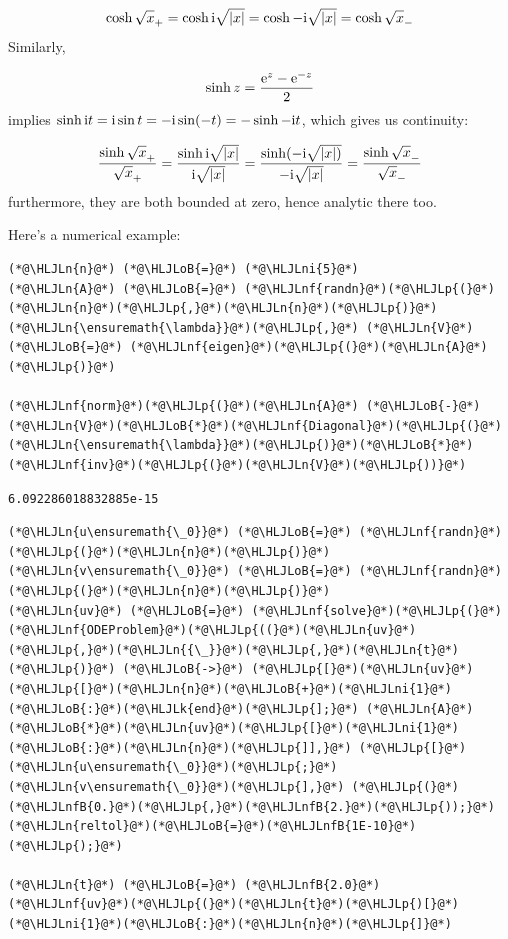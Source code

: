 \documentclass[12pt,a4paper]{article}
\newcommand{\HLJLk}[1]{\textcolor[RGB]{148,91,176}{\textbf{#1}}}
\newcommand{\HLJLn}[1]{#1}
\newcommand{\HLJLnf}[1]{\textcolor[RGB]{66,102,213}{#1}}
\newcommand{\HLJLnfB}[1]{\textcolor[RGB]{59,151,46}{#1}}
\newcommand{\HLJLni}[1]{\textcolor[RGB]{59,151,46}{#1}}
\newcommand{\HLJLoB}[1]{\textcolor[RGB]{102,102,102}{\textbf{#1}}}
\newcommand{\HLJLp}[1]{#1}
\def\I{ {\rm i} }
\def\E{ {\rm e} }
\begin{document}
\[
\cosh \sqrt{x}_+ = \cosh \I \sqrt{|x|} = \cosh -\I \sqrt{|x|} = \cosh\sqrt{x}_-
\]
Similarly, 

\[
\sinh z = {\E^z - \E^{-z} \over 2}
\]
implies $\sinh{\I t} = \I \sin t = - \I \sin(-t) = -\sinh{-\I t}$, which gives us continuity:

\[
{\sinh \sqrt{x}_+ \over \sqrt{x}_+} = {\sinh \I \sqrt{|x|} \over \I \sqrt{|x|}} = {\sinh(-\I \sqrt{|x|)} \over -\I \sqrt{|x|}} ={\sinh \sqrt{x}_- \over \sqrt{x}_-}
\]
furthermore, they are both bounded at zero, hence analytic there too.

Here's a numerical example:


\begin{lstlisting}
(*@\HLJLn{n}@*) (*@\HLJLoB{=}@*) (*@\HLJLni{5}@*)
(*@\HLJLn{A}@*) (*@\HLJLoB{=}@*) (*@\HLJLnf{randn}@*)(*@\HLJLp{(}@*)(*@\HLJLn{n}@*)(*@\HLJLp{,}@*)(*@\HLJLn{n}@*)(*@\HLJLp{)}@*) 
(*@\HLJLn{\ensuremath{\lambda}}@*)(*@\HLJLp{,}@*) (*@\HLJLn{V}@*) (*@\HLJLoB{=}@*) (*@\HLJLnf{eigen}@*)(*@\HLJLp{(}@*)(*@\HLJLn{A}@*)(*@\HLJLp{)}@*)

(*@\HLJLnf{norm}@*)(*@\HLJLp{(}@*)(*@\HLJLn{A}@*) (*@\HLJLoB{-}@*) (*@\HLJLn{V}@*)(*@\HLJLoB{*}@*)(*@\HLJLnf{Diagonal}@*)(*@\HLJLp{(}@*)(*@\HLJLn{\ensuremath{\lambda}}@*)(*@\HLJLp{)}@*)(*@\HLJLoB{*}@*)(*@\HLJLnf{inv}@*)(*@\HLJLp{(}@*)(*@\HLJLn{V}@*)(*@\HLJLp{))}@*)
\end{lstlisting}

\begin{lstlisting}
6.092286018832885e-15
\end{lstlisting}


\begin{lstlisting}
(*@\HLJLn{u\ensuremath{\_0}}@*) (*@\HLJLoB{=}@*) (*@\HLJLnf{randn}@*)(*@\HLJLp{(}@*)(*@\HLJLn{n}@*)(*@\HLJLp{)}@*)
(*@\HLJLn{v\ensuremath{\_0}}@*) (*@\HLJLoB{=}@*) (*@\HLJLnf{randn}@*)(*@\HLJLp{(}@*)(*@\HLJLn{n}@*)(*@\HLJLp{)}@*)
(*@\HLJLn{uv}@*) (*@\HLJLoB{=}@*) (*@\HLJLnf{solve}@*)(*@\HLJLp{(}@*)(*@\HLJLnf{ODEProblem}@*)(*@\HLJLp{((}@*)(*@\HLJLn{uv}@*)(*@\HLJLp{,}@*)(*@\HLJLn{{\_}}@*)(*@\HLJLp{,}@*)(*@\HLJLn{t}@*)(*@\HLJLp{)}@*) (*@\HLJLoB{->}@*) (*@\HLJLp{[}@*)(*@\HLJLn{uv}@*)(*@\HLJLp{[}@*)(*@\HLJLn{n}@*)(*@\HLJLoB{+}@*)(*@\HLJLni{1}@*)(*@\HLJLoB{:}@*)(*@\HLJLk{end}@*)(*@\HLJLp{];}@*) (*@\HLJLn{A}@*)(*@\HLJLoB{*}@*)(*@\HLJLn{uv}@*)(*@\HLJLp{[}@*)(*@\HLJLni{1}@*)(*@\HLJLoB{:}@*)(*@\HLJLn{n}@*)(*@\HLJLp{]],}@*) (*@\HLJLp{[}@*)(*@\HLJLn{u\ensuremath{\_0}}@*)(*@\HLJLp{;}@*) (*@\HLJLn{v\ensuremath{\_0}}@*)(*@\HLJLp{],}@*) (*@\HLJLp{(}@*)(*@\HLJLnfB{0.}@*)(*@\HLJLp{,}@*)(*@\HLJLnfB{2.}@*)(*@\HLJLp{));}@*) (*@\HLJLn{reltol}@*)(*@\HLJLoB{=}@*)(*@\HLJLnfB{1E-10}@*)(*@\HLJLp{);}@*)

(*@\HLJLn{t}@*) (*@\HLJLoB{=}@*) (*@\HLJLnfB{2.0}@*)
(*@\HLJLnf{uv}@*)(*@\HLJLp{(}@*)(*@\HLJLn{t}@*)(*@\HLJLp{)[}@*)(*@\HLJLni{1}@*)(*@\HLJLoB{:}@*)(*@\HLJLn{n}@*)(*@\HLJLp{]}@*)
\end{lstlisting}
\end{document}
